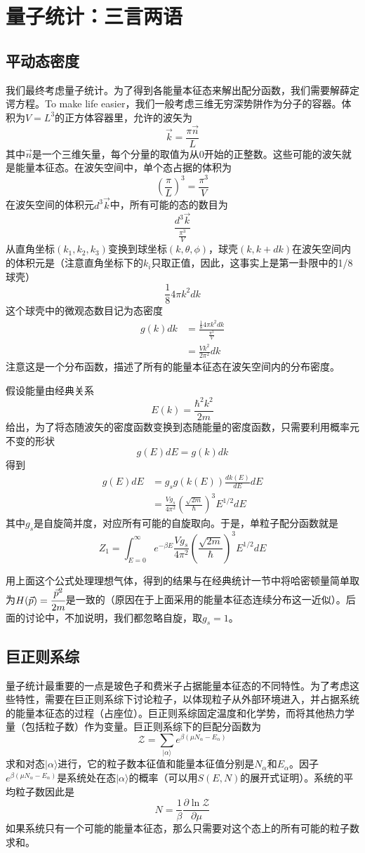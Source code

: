 \documentclass[a4paper,11pt]{ctexart}
\newcommand{\beq}{\begin{equation}}
\newcommand{\eeq}{\end{equation}}
\newcommand{\bea}{\begin{equation}\begin{aligned}}
\newcommand{\eea}{\end{aligned}\end{equation}}
\newcommand{\red}{\color{red}}
\newcommand{\grandz}{\mathcal{Z}}
\begin{document}
\section{量子统计：三言两语}
\subsection{平动态密度}
我们最终考虑量子统计。为了得到各能量本征态来解出配分函数，我们需要解薛定谔方程。To make life easier，我们一般考虑三维无穷深势阱作为分子的容器。体积为$V = L^3$的正方体容器里，允许的波矢为
\beq
\vec{k} = \frac{\pi \vec{n}}{L}
\eeq
其中$\vec{n}$是一个三维矢量，每个分量的取值为从0开始的正整数。这些可能的波矢就是能量本征态。在波矢空间中，单个态占据的体积为
\beq
(\frac{\pi}{L})^3 = \frac{\pi^3}{V}
\eeq
在波矢空间的体积元$d^3\vec{k}$中，所有可能的态的数目为
\beq
\frac{d^3\vec{k}}{\frac{\pi^3}{V}}
\eeq
从直角坐标$(k_1,k_2,k_3)$变换到球坐标$(k,\theta,\phi)$，球壳$(k,k+dk)$在波矢空间内的体积元是（注意直角坐标下的$k_i$只取正值，因此，这事实上是第一卦限中的1/8球壳）
\beq
\frac{1}{8} 4\pi k^2 dk
\eeq
这个球壳中的微观态数目记为{\red 态密度}
\bea
g(k)dk &= \frac{\frac{1}{8} 4\pi k^2 dk}{\frac{\pi^3}{V}} \\
&= \frac{Vk^2}{2\pi^2}dk
\eea
注意这是一个分布函数，描述了所有的能量本征态在波矢空间内的分布密度。
\par
假设能量由经典关系
\beq
E(k) = \frac{\hbar^2 k^2}{2m}
\eeq
给出，为了将态随波矢的密度函数变换到态随能量的密度函数，只需要利用概率元不变的形状
\beq
g(E)dE = g(k) dk
\eeq
得到
\bea
g(E)dE &= g_s g(k(E)) \frac{dk(E)}{dE} dE \\
&= \frac{Vg_s}{4\pi^2} (\frac{\sqrt{2m}}{\hbar})^3 E^{1/2} dE
\eea
其中$g_s$是自旋简并度，对应所有可能的自旋取向。于是，单粒子配分函数就是
\beq
Z_1 = \int_{E=0}^\infty e^{-\beta E}\frac{Vg_s}{4\pi^2} (\frac{\sqrt{2m}}{\hbar})^3 E^{1/2} dE
\eeq
\par
用上面这个公式处理理想气体，得到的结果与在经典统计一节中将哈密顿量简单取为$H(\vec{p})= \cfrac{\vec{p}^2}{2m}$是一致的（原因在于上面采用的能量本征态连续分布这一近似）。后面的讨论中，不加说明，我们都忽略自旋，取$g_s = 1$。
\subsection{巨正则系综}
量子统计最重要的一点是玻色子和费米子占据能量本征态的不同特性。为了考虑这些特性，需要在巨正则系综下讨论粒子，以体现粒子从外部环境进入，并占据系统的能量本征态的过程（占座位）。巨正则系综固定温度和化学势，而将其他热力学量（包括粒子数）作为变量。巨正则系综下的巨配分函数为
\beq
\grandz = \sum_{|\alpha \rangle}e^{\beta(\mu N_\alpha - E_\alpha)}
\eeq
求和对态$|\alpha \rangle$进行，它的粒子数本征值和能量本征值分别是$N_\alpha$和$E_\alpha$。因子$e^{\beta(\mu N_\alpha - E_\alpha)}$是系统处在态$|\alpha \rangle$的概率（可以用$S(E,N)$的展开式证明）。系统的平均粒子数因此是
\beq
N = \frac{1}{\beta} \frac{\partial \ln \grandz}{\partial \mu}
\eeq
如果系统只有一个可能的能量本征态，那么只需要对这个态上的所有可能的粒子数求和。
\end{document}
